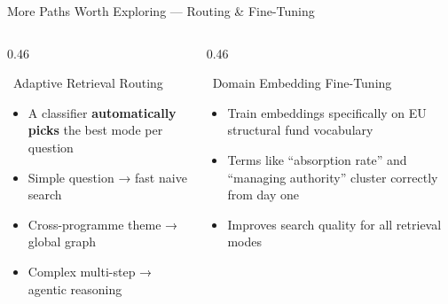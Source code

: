 \documentclass[aspectratio=169,11pt]{beamer}
\begin{document}
\begin{frame}{More Paths Worth Exploring — Routing \& Fine-Tuning}
  \vspace{0.2cm}
  \begin{columns}[t]
    \begin{column}{0.46\textwidth}
      \begin{block}{\faRoute\ Adaptive Retrieval Routing}
        \begin{itemize}\setlength\itemsep{8pt}
          \item A classifier \textbf{automatically picks}
                the best mode per question
          \item Simple question → fast naive search
          \item Cross-programme theme → global graph
          \item Complex multi-step → agentic reasoning
        \end{itemize}
      \end{block}
    \end{column}
    \begin{column}{0.46\textwidth}
      \begin{block}{\faMicrochip\ Domain Embedding Fine-Tuning}
        \begin{itemize}\setlength\itemsep{8pt}
          \item Train embeddings specifically on EU
                structural fund vocabulary
          \item Terms like ``absorption rate'' and
                ``managing authority'' cluster correctly
                from day one
          \item Improves search quality for all
                retrieval modes
        \end{itemize}
      \end{block}
    \end{column}
  \end{columns}
\end{frame}
\end{document}
